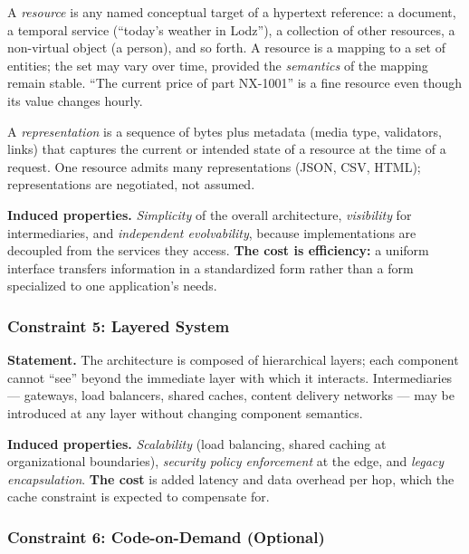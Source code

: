 \begin{definition}[Resource]
A \emph{resource} is any named conceptual target of a hypertext reference: a
document, a temporal service (``today's weather in Lodz''), a collection of other
resources, a non-virtual object (a person), and so forth. A resource is a mapping
to a set of entities; the set may vary over time, provided the \emph{semantics}
of the mapping remain stable. ``The current price of part NX-1001'' is a fine
resource even though its value changes hourly.
\end{definition}

\begin{definition}[Representation]
A \emph{representation} is a sequence of bytes plus metadata (media type,
validators, links) that captures the current or intended state of a resource at
the time of a request. One resource admits many representations (JSON, CSV,
HTML); representations are negotiated, not assumed.
\end{definition}

\textbf{Induced properties.} \emph{Simplicity} of the overall architecture,
\emph{visibility} for intermediaries, and \emph{independent evolvability}, because
implementations are decoupled from the services they access. \textbf{The cost is
efficiency:} a uniform interface transfers information in a standardized form
rather than a form specialized to one application's needs.

\subsubsection{Constraint 5: Layered System}

\textbf{Statement.} The architecture is composed of hierarchical layers; each
component cannot ``see'' beyond the immediate layer with which it interacts.
Intermediaries --- gateways, load balancers, shared caches, content delivery
networks --- may be introduced at any layer without changing component semantics.

\textbf{Induced properties.} \emph{Scalability} (load balancing, shared caching at
organizational boundaries), \emph{security policy enforcement} at the edge, and
\emph{legacy encapsulation}. \textbf{The cost} is added latency and data overhead
per hop, which the cache constraint is expected to compensate for.

\subsubsection{Constraint 6: Code-on-Demand (Optional)}

